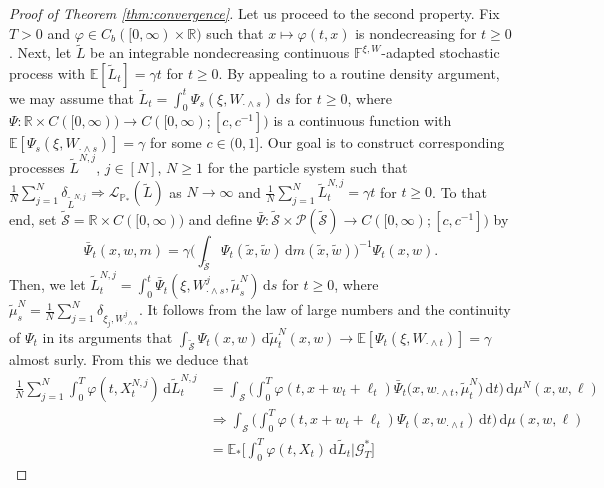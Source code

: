 \documentclass[11pt, a4paper]{article}
\theoremstyle{plain}
\theoremstyle{definition}
\theoremstyle{remark}
\numberwithin{equation}{section}
\newcommand{\ev}{\mathbb{E}}
\newcommand{\pr}{\mathbb{P}}
\newcommand{\R}{\mathbb{R}}
\renewcommand{\P}{\mathcal{P}}
\renewcommand{\L}{\mathcal{L}}
\renewcommand{\d}{\mathrm{d}}
\newcommand{\define}{\mathpunct{:}}
\newcommand{\bb}[1]{\mathbb{#1}}
\renewcommand{\cal}[1]{\mathcal{#1}}
\begin{document}
\begin{proof}[Proof of Theorem \ref{thm:convergence}]
Let us proceed to the second property. Fix $T > 0$ and $\varphi \in C_b([0, \infty) \times \R)$ such that $x \mapsto \varphi(t, x)$ is nondecreasing for $t \geq 0$. Next, let $\tilde{L}$ be an integrable nondecreasing continuous $\bb{F}^{\xi, W}$-adapted stochastic process with $\ev[\tilde{L}_t] = \gamma t$ for $t \geq 0$. By appealing to a routine density argument, %
we may assume that $\tilde{L}_t = \int_0^t \Psi_s(\xi, W_{\cdot \land s}) \, \d s$ for $t \geq 0$, where $\Psi \define \R \times C([0, \infty)) \to C([0, \infty); [c, c^{-1}])$ is a continuous function with $\ev[\Psi_s(\xi, W_{\cdot \land s})] = \gamma$ for some $c \in (0, 1]$. Our goal is to construct corresponding processes $\tilde{L}^{N, j}$, $j \in [N]$, $N \geq 1$ for the particle system such that $\frac{1}{N} \sum_{j = 1}^N \delta_{\tilde{L}^{N, j}} \Rightarrow \L_{\pr_{\ast}}(\tilde{L})$ as $N \to \infty$ and $\frac{1}{N} \sum_{j = 1}^N \tilde{L}^{N, j}_t = \gamma t$ for $t \geq 0$. To that end, set $\tilde{\cal{S}} = \R \times C([0, \infty))$ and define $\bar{\Psi} \define \tilde{\cal{S}} \times \P(\tilde{\cal{S}}) \to C([0, \infty); [c, c^{-1}])$ by
\begin{equation*}
    \bar{\Psi}_t(x, w, m) = \gamma \biggl(\int_{\tilde{\cal{S}}} \Psi_t(\tilde{x}, \tilde{w}) \, \d m(\tilde{x}, \tilde{w})\biggr)^{-1} \Psi_t(x, w).
\end{equation*}
Then, we let $\tilde{L}^{N, j}_t = \int_0^t \bar{\Psi}_t(\xi, W^j_{\cdot \land s}, \tilde{\mu}^N_s) \, \d s$ for $t \geq 0$, where $\tilde{\mu}^N_s = \frac{1}{N} \sum_{j = 1}^N \delta_{\xi_j, W^j_{\cdot \land s}}$. It follows from the law of large numbers and the continuity of $\Psi_t$ in its arguments that $\int_{\tilde{\cal{S}}} \Psi_t(x, w) \, \d \tilde{\mu}^N_t(x, w) \to \ev[\Psi_t(\xi, W_{\cdot \land t})] = \gamma$ almost surly. From this we deduce that
\begin{align*}
    \frac{1}{N} \sum_{j = 1}^N \int_0^T \varphi(t, X^{N, j}_t) \, \d \tilde{L}^{N, j}_t &= \int_{\cal{S}} \biggl(\int_0^T \varphi(t, x + w_t + \ell_t) \bar{\Psi}_t\bigl(x, w_{\cdot \land t}, \tilde{\mu}^N_t\bigr) \, \d t\biggr) \, \d \mu^N(x, w, \ell) \\
    &\Rightarrow \int_{\cal{S}} \biggl(\int_0^T \varphi(t, x + w_t + \ell_t) \Psi_t(x, w_{\cdot \land t}) \, \d t\biggr) \, \d \mu(x, w, \ell) \\
    &= \ev_{\ast}\biggl[\int_0^T \varphi(t, X_t) \, \d \tilde{L}_t \bigg\vert \cal{G}^{\ast}_T\biggr]
\end{align*}

\end{proof}
\end{document}
